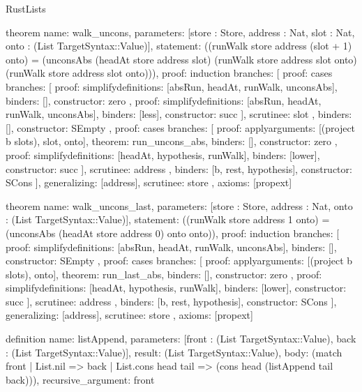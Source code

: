 \begin{lexlean}{RustLists}
\begin{semanticmodule}
theorem{
  name: walk_uncons,
  parameters: [store : Store, address : Nat, slot : Nat, onto : (List TargetSyntax::Value)],
  statement: ((runWalk store address (slot + 1) onto) = (unconsAbs (headAt store address slot) (runWalk store address slot onto) (runWalk store address slot onto))),
  proof: induction{
    branches: [
      {
        proof: cases{
          branches: [
            {
              proof: simplify{definitions: [absRun, headAt, runWalk, unconsAbs]},
              binders: [],
              constructor: zero
            },
            {
              proof: simplify{definitions: [absRun, headAt, runWalk, unconsAbs]},
              binders: [less],
              constructor: succ
            }
          ],
          scrutinee: slot
        },
        binders: [],
        constructor: SEmpty
      },
      {
        proof: cases{
          branches: [
            {
              proof: apply{arguments: [(project b slots), slot, onto], theorem: run_uncons_abs},
              binders: [],
              constructor: zero
            },
            {
              proof: simplify{definitions: [headAt, hypothesis, runWalk]},
              binders: [lower],
              constructor: succ
            }
          ],
          scrutinee: address
        },
        binders: [b, rest, hypothesis],
        constructor: SCons
      }
    ],
    generalizing: [address],
    scrutinee: store
  },
  axioms: [propext]
}

theorem{
  name: walk_uncons_last,
  parameters: [store : Store, address : Nat, onto : (List TargetSyntax::Value)],
  statement: ((runWalk store address 1 onto) = (unconsAbs (headAt store address 0) onto onto)),
  proof: induction{
    branches: [
      {
        proof: simplify{definitions: [absRun, headAt, runWalk, unconsAbs]},
        binders: [],
        constructor: SEmpty
      },
      {
        proof: cases{
          branches: [
            {
              proof: apply{arguments: [(project b slots), onto], theorem: run_last_abs},
              binders: [],
              constructor: zero
            },
            {
              proof: simplify{definitions: [headAt, hypothesis, runWalk]},
              binders: [lower],
              constructor: succ
            }
          ],
          scrutinee: address
        },
        binders: [b, rest, hypothesis],
        constructor: SCons
      }
    ],
    generalizing: [address],
    scrutinee: store
  },
  axioms: [propext]
}

definition{
  name: listAppend,
  parameters: [front : (List TargetSyntax::Value), back : (List TargetSyntax::Value)],
  result: (List TargetSyntax::Value),
  body: (match front
    | List.nil => back
    | List.cons head tail => (cons head (listAppend tail back))),
  recursive_argument: front
}


\end{semanticmodule}
\end{lexlean}

